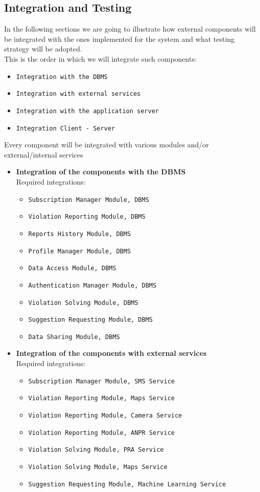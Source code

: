 \documentclass[12pt,a4paper]{article}
\begin{document}
\subsection{Integration and Testing}
In the following sections we are going to illustrate how external components will be integrated with the ones implemented for the system and what testing strategy will be adopted.\\

This is the order in which we will integrate such components:
\begin{itemize}
\item \texttt{Integration with the DBMS}
\item \texttt{Integration with external services}
\item \texttt{Integration with the application server}
\item \texttt{Integration Client - Server}
\end{itemize}
Every component will be integrated with various modules and/or external/internal services
\begin{itemize}
\item \textbf{Integration of the components with the DBMS}\\
Required integrations:
\begin{itemize}
\item \texttt{Subscription Manager Module, DBMS}
\item \texttt{Violation Reporting Module, DBMS}
\item \texttt{Reports History Module, DBMS}
\item \texttt{Profile Manager Module, DBMS}
\item \texttt{Data Access Module, DBMS}
\item \texttt{Authentication Manager Module, DBMS}
\item \texttt{Violation Solving Module, DBMS}
\item \texttt{Suggestion Requesting Module, DBMS}
\item \texttt{Data Sharing Module, DBMS}
\end{itemize}
\end{itemize}

\begin{itemize}
\item \textbf{Integration of the components with external services}\\
Required integrations:
\begin{itemize}
\item \texttt{Subscription Manager Module, SMS Service}
\item \texttt{Violation Reporting Module, Maps Service}
\item \texttt{Violation Reporting Module, Camera Service}
\item \texttt{Violation Reporting Module, ANPR Service}
\item \texttt{Violation Solving Module, PRA Service}
\item \texttt{Violation Solving Module, Maps Service}
\item \texttt{Suggestion Requesting Module, Machine Learning Service}
\end{itemize}
\end{itemize}
\end{document}
